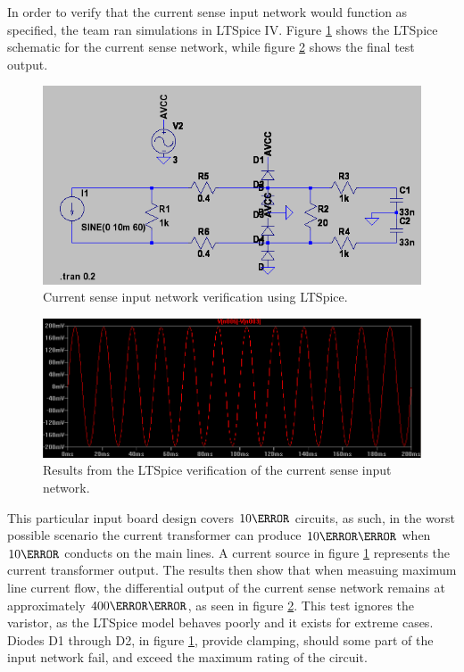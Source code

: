 In order to verify that the current sense input network would function as specified, the team ran simulations in LTSpice IV. Figure \ref{fig:current_sense_ltspice} shows the LTSpice schematic for the current sense network, while figure \ref{fig:current_sense_ltspice_trace} shows the final test output.
\begin{figure}[htbp]
  \centering
  \includegraphics[width=5in]{includes/emeterhw/current_sense_ltspice}
  \caption{Current sense input network verification using LTSpice.}
  \label{fig:current_sense_ltspice}
\end{figure}
\begin{figure}[htbp]
  \centering
  \includegraphics[width=5in]{includes/emeterhw/current_sense_ltspice_trace}
  \caption{Results from the LTSpice verification of the current sense input network.}
  \label{fig:current_sense_ltspice_trace}
\end{figure}
This particular input board design covers $10\ampere$ circuits, as such, in the worst possible scenario the current transformer can produce $10\milli\ampere$ when $10\ampere$ conducts on the main lines. A current source in figure \ref{fig:current_sense_ltspice} represents the current transformer output. The results then show that when measuing maximum line current flow, the differential output of the current sense network remains at approximately $400\milli\volt$, as seen in figure \ref{fig:current_sense_ltspice_trace}. This test ignores the varistor, as the LTSpice model behaves poorly and it exists for extreme cases. Diodes D1 through D2, in figure \ref{fig:current_sense_ltspice}, provide clamping, should some part of the input network fail, and exceed the maximum rating of the circuit.

